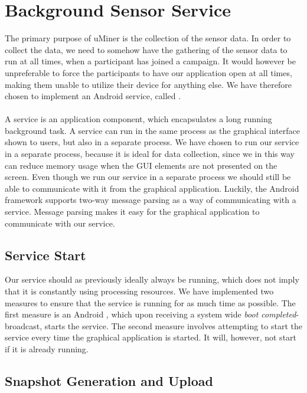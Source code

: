 
\section{Background Sensor Service}
\label{sec:background_sensor_service}
The primary purpose of uMiner is the collection of the sensor data. In order to collect the data, we need to somehow have the gathering of the sensor data to run at all times, when a participant has joined a campaign. It would however be unpreferable to force the participants to have our application open at all times, making them unable to utilize their device for anything else. We have therefore chosen to implement an Android service, called . 
\\\\
A service is an application component, which encapsulates a long running background task. A service can run in the same process as the graphical interface shown to users, but also in a separate process. We have chosen to run our service in a separate process, because it is ideal for data collection, since we in this way can reduce memory usage when the GUI elements are not presented on the screen. Even though we run our service in a separate process we should still be able to communicate with it from the graphical application. Luckily, the Android framework supports two-way message parsing as a way of communicating with a service. Message parsing makes it easy for the graphical application to communicate with our service.

\subsection{Service Start}
\label{sub:service_start}
Our service should as previously ideally always be running, which does not imply that it is constantly using processing resources. We have implemented two measures to ensure that the service is running for as much time as possible. The first measure is an Android , which upon receiving a system wide \emph{boot completed}-broadcast, starts the service. The second measure involves attempting to start the service every time the graphical application is started. It will, however, not start if it is already running.

\subsection{Snapshot Generation and Upload}
\label{sub:background_sensor_service_snapshot_generation_and_upload}

